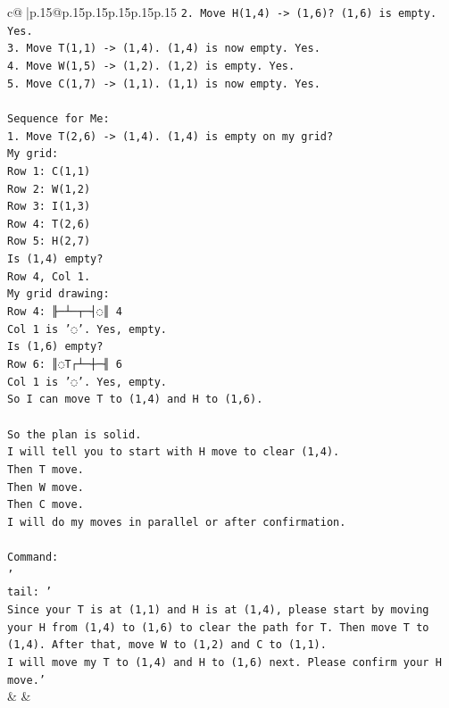 \documentclass{article}
\begin{document}
{\begin{supertabular}{c@{$\;$}|p{.15\linewidth}@{}p{.15\linewidth}p{.15\linewidth}p{.15\linewidth}p{.15\linewidth}p{.15\linewidth}}
{{{\texttt{2. Move H(1,4) {-}> (1,6)? (1,6) is empty. Yes.} \\
\texttt{3. Move T(1,1) {-}> (1,4). (1,4) is now empty. Yes.} \\
\texttt{4. Move W(1,5) {-}> (1,2). (1,2) is empty. Yes.} \\
\texttt{5. Move C(1,7) {-}> (1,1). (1,1) is now empty. Yes.} \\
\\ 
\texttt{Sequence for Me:} \\
\texttt{1. Move T(2,6) {-}> (1,4). (1,4) is empty on my grid?} \\
\texttt{My grid:} \\
\texttt{Row 1: C(1,1)} \\
\texttt{Row 2: W(1,2)} \\
\texttt{Row 3: I(1,3)} \\
\texttt{Row 4: T(2,6)} \\
\texttt{Row 5: H(2,7)} \\
\texttt{Is (1,4) empty?} \\
\texttt{Row 4, Col 1.} \\
\texttt{My grid drawing:} \\
\texttt{Row 4: ╟─┴─┬─┤◌║ 4} \\
\texttt{Col 1 is '◌'. Yes, empty.} \\
\texttt{Is (1,6) empty?} \\
\texttt{Row 6: ║◌T┌┴─┼─╢ 6} \\
\texttt{Col 1 is '◌'. Yes, empty.} \\
\texttt{So I can move T to (1,4) and H to (1,6).} \\
\\ 
\texttt{So the plan is solid.} \\
\texttt{I will tell you to start with H move to clear (1,4).} \\
\texttt{Then T move.} \\
\texttt{Then W move.} \\
\texttt{Then C move.} \\
\texttt{I will do my moves in parallel or after confirmation.} \\
\\ 
\texttt{Command:} \\
\texttt{'} \\
\texttt{tail: '} \\
\texttt{Since your T is at (1,1) and H is at (1,4), please start by moving your H from (1,4) to (1,6) to clear the path for T. Then move T to (1,4). After that, move W to (1,2) and C to (1,1).} \\
\texttt{I will move my T to (1,4) and H to (1,6) next. Please confirm your H move.'} \\
            }
        }
    }
    & & \\ \\


\end{supertabular}}
\end{document}
